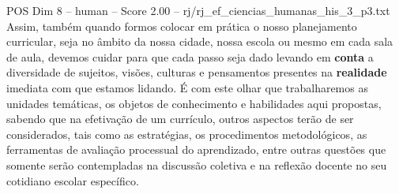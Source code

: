 \begin{textsample}{POS Dim 8 – human – Score 2.00 – rj/rj\_ef\_ciencias\_humanas\_his\_3\_p3.txt}  \label{ex:f8_pos_007}
Assim, também quando formos colocar em prática o nosso planejamento curricular, seja no âmbito da nossa cidade, nossa escola ou mesmo em cada sala de aula, devemos cuidar para que cada passo seja dado levando em \textbf{conta} a diversidade de sujeitos, visões, culturas e pensamentos presentes na \textbf{realidade} imediata com que estamos lidando. É com este olhar que trabalharemos as unidades temáticas, os objetos de conhecimento e habilidades aqui propostas, sabendo que na efetivação de um currículo, outros aspectos terão de ser considerados, tais como as estratégias, os procedimentos metodológicos, as ferramentas de avaliação processual do aprendizado, entre outras questões que somente serão contempladas na discussão coletiva e na reflexão docente no seu cotidiano escolar específico.

\end{textsample}
